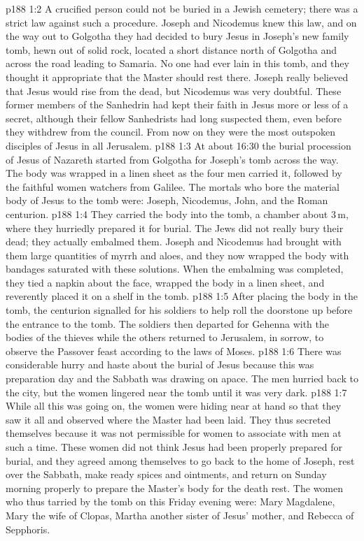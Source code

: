 \vs p188 1:2 A crucified person could not be buried in a Jewish cemetery; there was a strict law against such a procedure. Joseph and Nicodemus knew this law, and on the way out to Golgotha they had decided to bury Jesus in Joseph’s new family tomb, hewn out of solid rock, located a short distance north of Golgotha and across the road leading to Samaria. No one had ever lain in this tomb, and they thought it appropriate that the Master should rest there. Joseph really believed that Jesus would rise from the dead, but Nicodemus was very doubtful. These former members of the Sanhedrin had kept their faith in Jesus more or less of a secret, although their fellow Sanhedrists had long suspected them, even before they withdrew from the council. From now on they were the most outspoken disciples of Jesus in all Jerusalem.
\vs p188 1:3 At about 16:30 the burial procession of Jesus of Nazareth started from Golgotha for Joseph’s tomb across the way. The body was wrapped in a linen sheet as the four men carried it, followed by the faithful women watchers from Galilee. The mortals who bore the material body of Jesus to the tomb were: Joseph, Nicodemus, John, and the Roman centurion.
\vs p188 1:4 They carried the body into the tomb, a chamber about 3\,m, where they hurriedly prepared it for burial. The Jews did not really bury their dead; they actually embalmed them. Joseph and Nicodemus had brought with them large quantities of myrrh and aloes, and they now wrapped the body with bandages saturated with these solutions. When the embalming was completed, they tied a napkin about the face, wrapped the body in a linen sheet, and reverently placed it on a shelf in the tomb.
\vs p188 1:5 After placing the body in the tomb, the centurion signalled for his soldiers to help roll the doorstone up before the entrance to the tomb. The soldiers then departed for Gehenna with the bodies of the thieves while the others returned to Jerusalem, in sorrow, to observe the Passover feast according to the laws of Moses.
\vs p188 1:6 There was considerable hurry and haste about the burial of Jesus because this was preparation day and the Sabbath was drawing on apace. The men hurried back to the city, but the women lingered near the tomb until it was very dark.
\vs p188 1:7 While all this was going on, the women were hiding near at hand so that they saw it all and observed where the Master had been laid. They thus secreted themselves because it was not permissible for women to associate with men at such a time. These women did not think Jesus had been properly prepared for burial, and they agreed among themselves to go back to the home of Joseph, rest over the Sabbath, make ready spices and ointments, and return on Sunday morning properly to prepare the Master’s body for the death rest. The women who thus tarried by the tomb on this Friday evening were: Mary Magdalene, Mary the wife of Clopas, Martha another sister of Jesus’ mother, and Rebecca of Sepphoris.
